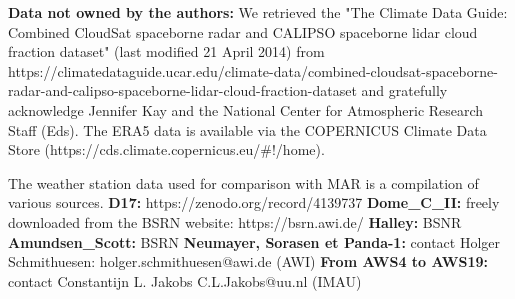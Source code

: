 \documentclass[draft]{agujournal2019}
\begin{document}
\textbf{Data not owned by the authors:} We retrieved the "The Climate Data Guide: Combined CloudSat spaceborne radar and CALIPSO spaceborne lidar cloud fraction dataset" (last modified 21 April 2014) from https://climatedataguide.ucar.edu/climate-data/combined-cloudsat-spaceborne-radar-and-calipso-spaceborne-lidar-cloud-fraction-dataset and gratefully acknowledge Jennifer Kay and the National Center for Atmospheric Research Staff (Eds). The ERA5 data is available via the COPERNICUS Climate Data Store \hfill \break 
(https://cds.climate.copernicus.eu/\#!/home).

The weather station data used for comparison with MAR is a compilation of various sources.\hfill \break 
\textbf{D17:} https://zenodo.org/record/4139737 \hfill \break 
\textbf{Dome\_C\_II:} freely downloaded from the BSRN website: https://bsrn.awi.de/ \hfill \break 
\textbf{Halley:} BSNR \hfill \break 
\textbf{Amundsen\_Scott:} BSRN \hfill \break 
\textbf{Neumayer, Sorasen et Panda-1:} contact Holger Schmithuesen: holger.schmithuesen@awi.de (AWI) \hfill \break 
\textbf{From AWS4 to AWS19:} contact Constantijn L. Jakobs C.L.Jakobs@uu.nl (IMAU) \hfill \break 


%
%





%
%
%
%
%
\end{document}
